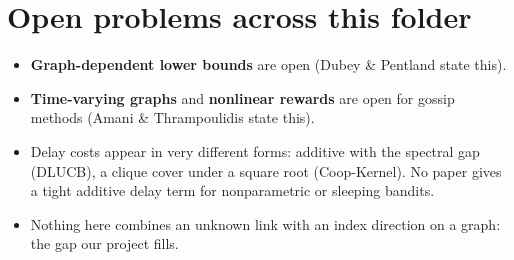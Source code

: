 \documentclass[11pt]{article}
\begin{document}
\section{Open problems across this folder}
\begin{itemize}\item \textbf{Graph-dependent lower bounds} are open (Dubey \& Pentland state this).\item \textbf{Time-varying graphs} and \textbf{nonlinear rewards} are open for gossip methods (Amani \& Thrampoulidis state this).\item Delay costs appear in very different forms: additive with the spectral gap (DLUCB), a clique cover under a square root (Coop-Kernel). No paper gives a tight additive delay term for nonparametric or sleeping bandits.\item Nothing here combines an unknown link with an index direction on a graph: the gap our project fills.\end{itemize}
\end{document}
